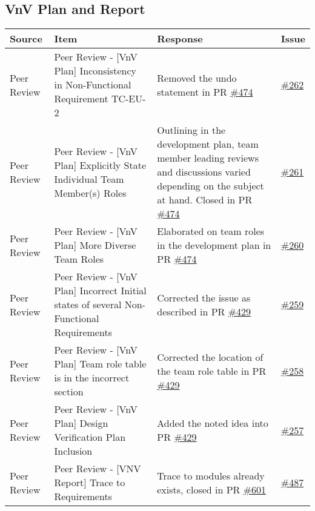 \documentclass{article}
\begin{document}
\subsection{VnV Plan and Report}
\begin{longtable}{|m{3cm}|m{3cm}|m{5cm}|m{1cm}|}
  \hline
  \textbf{Source} & \textbf{Item} & \textbf{Response} & \textbf{Issue}\\
  \hline
   Peer Review & Peer Review - [VnV Plan] Inconsistency in Non-Functional Requirement TC-EU-2 & Removed the undo statement in PR \href{https://github.com/Spitgranger/SyncMaster/pull/474}{\#474} 
   & \href{https://github.com/Spitgranger/SyncMaster/pull/262}{\#262}\\
   \hline
   Peer Review & Peer Review - [VnV Plan] Explicitly State Individual Team Member(s) Roles & Outlining in the development plan, team member leading reviews 
   and discussions varied depending on the subject at hand. Closed in PR \href{https://github.com/Spitgranger/SyncMaster/pull/474}{\#474} 
   & \href{https://github.com/Spitgranger/SyncMaster/pull/261}{\#261}\\
   \hline
   Peer Review & Peer Review - [VnV Plan] More Diverse Team Roles & Elaborated on team roles in the development plan in PR \href{https://github.com/Spitgranger/SyncMaster/pull/474}{\#474} 
   & \href{https://github.com/Spitgranger/SyncMaster/pull/260}{\#260}\\
   \hline
   Peer Review & Peer Review - [VnV Plan] Incorrect Initial states of several Non-Functional Requirements & Corrected the issue as described
   in PR \href{https://github.com/Spitgranger/SyncMaster/pull/429}{\#429} & \href{https://github.com/Spitgranger/SyncMaster/pull/259}{\#259}\\
   \hline
   Peer Review & Peer Review - [VnV Plan] Team role table is in the incorrect section & Corrected the location of the team role 
   table in PR \href{https://github.com/Spitgranger/SyncMaster/pull/429}{\#429} & \href{https://github.com/Spitgranger/SyncMaster/pull/258}{\#258}\\
   \hline
   Peer Review & Peer Review - [VnV Plan] Design Verification Plan Inclusion & Added the noted idea into PR \href{https://github.com/Spitgranger/SyncMaster/pull/429}{\#429} 
   & \href{https://github.com/Spitgranger/SyncMaster/pull/257}{\#257}\\
   \hline
   Peer Review & Peer Review - [VNV Report] Trace to Requirements & Trace to modules already exists, closed in PR \href{https://github.com/Spitgranger/SyncMaster/pull/601}{\#601} 
   & \href{https://github.com/Spitgranger/SyncMaster/pull/487}{\#487}\\

\end{longtable}
\end{document}
